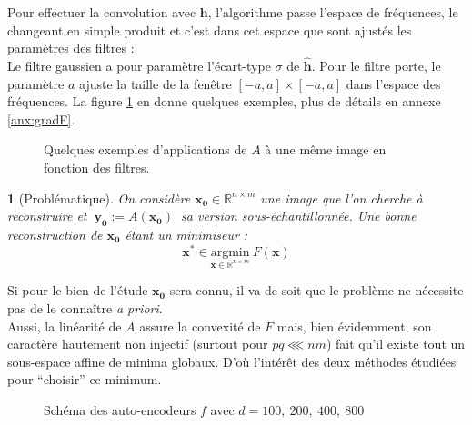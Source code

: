 \documentclass[hidelinks, french]{article} %
\newcommand{\R}{\mathbb{R}}
\newcommand{\apriori}{\textit{a priori}}
\newcommand{\argmin}[1]{\underset{#1}{\text{argmin}}}
\renewcommand{\bf}[1]{\boldsymbol{#1}}
\theoremstyle{enonce}
\theoremstyle{special}
\newtheorem{enonce}{}
\theoremstyle{rq}
\theoremstyle{exo}
\theoremstyle{demo}
\begin{document}
Pour effectuer la convolution avec $\bf{h}$, l'algorithme passe l'espace de fréquences, le changeant en simple produit et c'est dans cet espace que sont ajustés les paramètres des filtres :
\\
Le filtre gaussien a pour paramètre l'écart-type $\sigma$ de $\hat{\bf{h}}$. Pour le filtre porte, le paramètre $a$ ajuste la taille de la fenêtre $[-a,a]\times[-a,a]$ dans l'espace des fréquences. La figure \ref{fig:filtres} en donne quelques exemples, plus de détails en annexe \ref{anx:gradF}.
\\

\begin{figure}[b]
	\begin{floatrow}
		{
		}
		
		{
		}
	\end{floatrow}
\end{figure}

\begin{figure}[h]\centering
	
	\caption{Quelques exemples d'applications de $A$ à une même image en fonction des filtres. }
	\label{fig:filtres}
\end{figure}

\begin{enonce}[Problématique]
	On considère $\bf{x_0}\in\R^{n\times m}$ une image que l'on cherche à reconstruire et $\ \bf{y_0}:=A(\bf{x_0})\ $ sa version sous-échantillonnée. Une bonne reconstruction de $\bf{x_0}$ étant un minimiseur :
	\begin{equation}\label{eq:probleme}
		\bf{x^*}\in \argmin{\bf{x}\in\R^{n\times m}}\ F(\bf{x})\end{equation}\end{enonce}

Si pour le bien de l'étude $\bf{x_0}$ sera connu, il va de soit que le problème ne nécessite pas de le connaître \apriori.
\\
Aussi, la linéarité de $A$ assure la convexité de $F$ mais, bien évidemment, son caractère hautement non injectif (surtout pour $pq\lll nm$) fait qu'il existe tout un sous-espace affine de minima globaux. D'où l'intérêt des deux méthodes étudiées pour ``choisir'' ce minimum.
\\

\begin{wrapfigure}{r}{0.4\textwidth}%
	
	\caption{Schéma des auto-encodeurs  $f$ avec $d=100,\ 200,\ 400,\ 800$}
	\label{fig:AEschem}
\end{wrapfigure}
\end{document}
